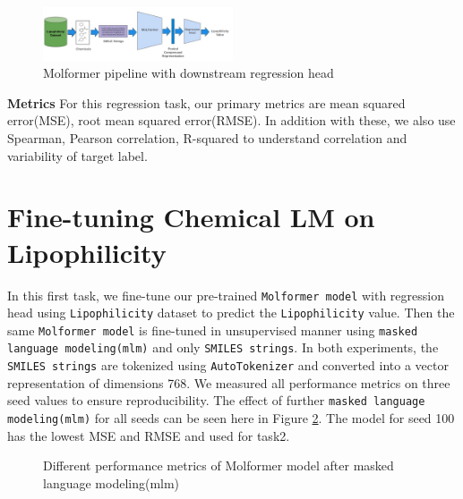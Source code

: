 \documentclass[11pt]{article}
\begin{document}
\begin{figure}[htp]
    \centering
    \includegraphics[width=0.5\textwidth]{pictures/pipeline.jpeg}
    \caption{Molformer pipeline with downstream regression head}
    \label{fig:pipeline_regression}
\end{figure}

\textbf{Metrics} For this regression task, our primary metrics are mean squared error(MSE), root mean squared error(RMSE). In addition with these, we also use Spearman, Pearson correlation, R-squared to understand correlation and variability of target label. 

\section*{Fine-tuning Chemical LM on Lipophilicity}
In this first task, we fine-tune our pre-trained \verb|Molformer model| with regression head using \verb|Lipophilicity| dataset to predict the \verb|Lipophilicity| value. Then the same \verb|Molformer model| is fine-tuned in unsupervised manner using \verb|masked language modeling(mlm)| and only \verb|SMILES strings|. In both experiments, the \verb|SMILES strings| are tokenized using \verb|AutoTokenizer| and converted into a vector representation of dimensions 768. We measured all performance metrics on three seed values to ensure reproducibility. The effect of further \verb|masked language modeling(mlm)| for all seeds can be seen here in Figure \ref{fig:mlm_seed}. The model for seed 100 has the lowest MSE and RMSE and used for task2.  

\begin{figure}[htp]
    \centering
    \caption{Different performance metrics of Molformer model after masked language modeling(mlm) }
    \label{fig:mlm_seed}
\end{figure}
\end{document}

